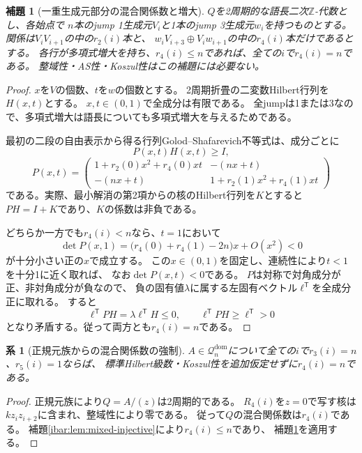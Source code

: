 \documentclass[11pt,a4paper]{ltjsarticle}
\newtheorem{lemma}[theorem]{補題}
\newtheorem{corollary}[theorem]{系}
\theoremstyle{definition}
\begin{document}
\begin{lemma}[一重生成元部分の混合関係数と増大]
\label{ibar:lem:two-period-gs}
$Q$を2周期的な語長二次$\mathbb Z$-代数とし、各始点で
$n$本のjump 1生成元$V_i$と1本のjump 3生成元$w_i$を持つものとする。
関係は$V_iV_{i+1}$の中の$r_2(i)$本と、
$w_iV_{i+3}\oplus V_iw_{i+1}$の中の$r_4(i)$本だけであるとする。
各行が多項式増大を持ち、$r_4(i)\le n$であれば、全ての$i$で$r_4(i)=n$である。
整域性・AS性・Koszul性はこの補題には必要ない。
\end{lemma}
\begin{proof}
$x$を$V$の個数、$t$を$w$の個数とする。
2周期折畳の二変数Hilbert行列を$H(x,t)$とする。
$x,t\in(0,1)$で全成分は有限である。
全jumpは1または3なので、多項式増大は語長についても多項式増大を与えるためである。

最初の二段の自由表示から得る行列Golod--Shafarevich不等式は、成分ごとに
\[
P(x,t)H(x,t)\ge I,
\]
\[
P(x,t)=
\begin{pmatrix}
1+r_2(0)x^2+r_4(0)xt&-(nx+t)\\
-(nx+t)&1+r_2(1)x^2+r_4(1)xt
\end{pmatrix}
\]
である。実際、最小解消の第2項からの核のHilbert行列を$K$とすると
$PH=I+K$であり、$K$の係数は非負である。

どちらか一方でも$r_4(i)<n$なら、$t=1$において
\[
\det P(x,1)=\bigl(r_4(0)+r_4(1)-2n\bigr)x+O(x^2)<0
\]
が十分小さい正の$x$で成立する。
この$x\in(0,1)$を固定し、連続性により$t<1$を十分1に近く取れば、
なお$\det P(x,t)<0$である。
$P$は対称で対角成分が正、非対角成分が負なので、
負の固有値$\lambda$に属する左固有ベクトル$\ell^\mathsf T$を全成分正に取れる。
すると
\[
\ell^\mathsf T P H=\lambda\ell^\mathsf T H\le0,
\qquad
\ell^\mathsf T P H\ge\ell^\mathsf T>0
\]
となり矛盾する。従って両方とも$r_4(i)=n$である。
\end{proof}

\begin{corollary}[正規元族からの混合関係数の強制]
\label{ibar:cor:normal-z-rank}
$A\in\mathcal Q_n^{\mathrm{dom}}$について全ての$i$で$r_3(i)=n$、$r_5(i)=1$ならば、
標準Hilbert級数・Koszul性を追加仮定せずに$r_4(i)=n$である。
\end{corollary}
\begin{proof}
正規元族により$Q=A/(z)$は2周期的である。
$R_4(i)$を$z=0$で写す核は$kz_i z_{i+2}$に含まれ、整域性により零である。
従って$Q$の混合関係数は$r_4(i)$である。
補題\ref{ibar:lem:mixed-injective}により$r_4(i)\le n$であり、
補題\ref{ibar:lem:two-period-gs}を適用する。
\end{proof}
\end{document}
